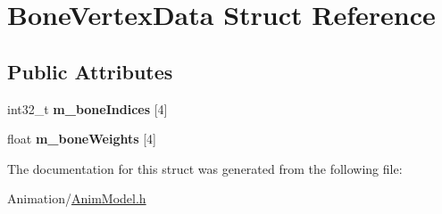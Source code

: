 \hypertarget{structBoneVertexData}{}\section{Bone\+Vertex\+Data Struct Reference}
\label{structBoneVertexData}
\subsection*{Public Attributes}
\begin{DoxyCompactItemize}
\item 
\mbox{\label{structBoneVertexData_ab3244a27730090f33a966f117796a15c}} 
int32\+\_\+t {\bfseries m\+\_\+bone\+Indices} \mbox{[}4\mbox{]}
\item 
\mbox{\label{structBoneVertexData_ab8de7e288e7068d116df550470c41c14}} 
float {\bfseries m\+\_\+bone\+Weights} \mbox{[}4\mbox{]}
\end{DoxyCompactItemize}


The documentation for this struct was generated from the following file\+:\begin{DoxyCompactItemize}
\item 
Animation/\hyperlink{AnimModel_8h}{Anim\+Model.\+h}\end{DoxyCompactItemize}
